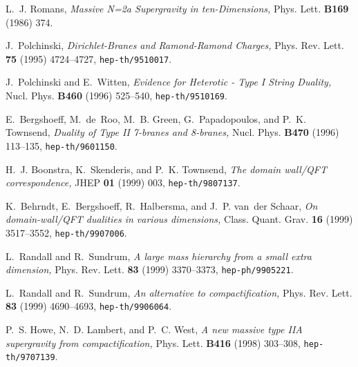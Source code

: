 \documentclass[a4paper,12pt]{article}
\begin{document}
\providecommand{\href}[2]{#2}\begingroup\raggedright\begin{thebibliography}{10}
L.~J. Romans, \emph{Massive N=2a Supergravity in ten-Dimensions,} Phys. Lett.
  {\bf B169} (1986)
374.

J.~Polchinski, \emph{Dirichlet-Branes and Ramond-Ramond Charges,} Phys. Rev.
  Lett. {\bf 75} (1995) 4724--4727,
\href{http://arXiv.org/abs/hep-th/9510017}{{\tt hep-th/9510017}}.

J.~Polchinski and E.~Witten, \emph{Evidence for Heterotic - Type I String
  Duality,} Nucl. Phys. {\bf B460} (1996) 525--540,
\href{http://arXiv.org/abs/hep-th/9510169}{{\tt hep-th/9510169}}.

E.~Bergshoeff, M.~de~Roo, M.~B. Green, G.~Papadopoulos, and P.~K. Townsend,
  \emph{Duality of Type II 7-branes and 8-branes,} Nucl. Phys. {\bf B470}
  (1996) 113--135,
\href{http://arXiv.org/abs/hep-th/9601150}{{\tt hep-th/9601150}}.

H.~J. Boonstra, K.~Skenderis, and P.~K. Townsend, \emph{The domain wall/QFT
  correspondence,} JHEP {\bf 01} (1999) 003,
\href{http://arXiv.org/abs/hep-th/9807137}{{\tt hep-th/9807137}}.

K.~Behrndt, E.~Bergshoeff, R.~Halbersma, and J.~P. van~der Schaar, \emph{On
  domain-wall/QFT dualities in various dimensions,} Class. Quant. Grav. {\bf
  16} (1999) 3517--3552,
\href{http://arXiv.org/abs/hep-th/9907006}{{\tt hep-th/9907006}}.

L.~Randall and R.~Sundrum, \emph{A large mass hierarchy from a small extra
  dimension,} Phys. Rev. Lett. {\bf 83} (1999) 3370--3373,
\href{http://arXiv.org/abs/hep-ph/9905221}{{\tt hep-ph/9905221}}.

L.~Randall and R.~Sundrum, \emph{An alternative to compactification,} Phys.
  Rev. Lett. {\bf 83} (1999) 4690--4693,
\href{http://arXiv.org/abs/hep-th/9906064}{{\tt hep-th/9906064}}.

P.~S. Howe, N.~D. Lambert, and P.~C. West, \emph{A new massive type IIA
  supergravity from compactification,} Phys. Lett. {\bf B416} (1998) 303--308,
\href{http://arXiv.org/abs/hep-th/9707139}{{\tt hep-th/9707139}}.


\end{thebibliography}
\end{document}
